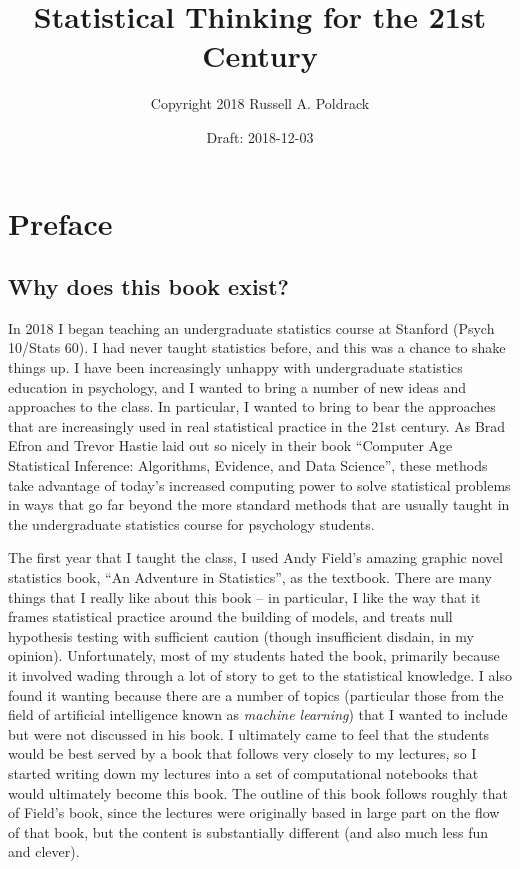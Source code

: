 \documentclass[]{book}
\title{Statistical Thinking for the 21st Century}
\author{Copyright 2018 Russell A. Poldrack}
\date{Draft: 2018-12-03}
\theoremstyle{definition}
\theoremstyle{definition}
\theoremstyle{definition}
\theoremstyle{remark}
\begin{document}
\maketitle

{
\setcounter{tocdepth}{1}
\tableofcontents
}
\chapter*{Preface}\label{preface}

\section{Why does this book exist?}\label{why-does-this-book-exist}

In 2018 I began teaching an undergraduate statistics course at Stanford
(Psych 10/Stats 60). I had never taught statistics before, and this was
a chance to shake things up. I have been increasingly unhappy with
undergraduate statistics education in psychology, and I wanted to bring
a number of new ideas and approaches to the class. In particular, I
wanted to bring to bear the approaches that are increasingly used in
real statistical practice in the 21st century. As Brad Efron and Trevor
Hastie laid out so nicely in their book ``Computer Age Statistical
Inference: Algorithms, Evidence, and Data Science'', these methods take
advantage of today's increased computing power to solve statistical
problems in ways that go far beyond the more standard methods that are
usually taught in the undergraduate statistics course for psychology
students.

The first year that I taught the class, I used Andy Field's amazing
graphic novel statistics book, ``An Adventure in Statistics'', as the
textbook. There are many things that I really like about this book -- in
particular, I like the way that it frames statistical practice around
the building of models, and treats null hypothesis testing with
sufficient caution (though insufficient disdain, in my opinion).
Unfortunately, most of my students hated the book, primarily because it
involved wading through a lot of story to get to the statistical
knowledge. I also found it wanting because there are a number of topics
(particular those from the field of artificial intelligence known as
\emph{machine learning}) that I wanted to include but were not discussed
in his book. I ultimately came to feel that the students would be best
served by a book that follows very closely to my lectures, so I started
writing down my lectures into a set of computational notebooks that
would ultimately become this book. The outline of this book follows
roughly that of Field's book, since the lectures were originally based
in large part on the flow of that book, but the content is substantially
different (and also much less fun and clever).
\end{document}
